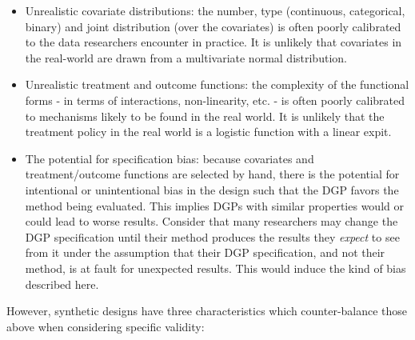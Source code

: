 \documentclass[../main.tex]{subfiles}
\begin{document}
\vspace{\baselineskip}
\begin{itemize}
    \item Unrealistic covariate distributions: the number, type (continuous, categorical, binary) and joint distribution (over the covariates) is often poorly calibrated to the data researchers encounter in practice. It is unlikely that covariates in the real-world are drawn from a multivariate normal distribution.\par


\vspace{\baselineskip}
    \item Unrealistic treatment and outcome functions: the complexity of the functional forms - in terms of interactions, non-linearity, etc. - is often poorly calibrated to mechanisms likely to be found in the real world. It is unlikely that the treatment policy in the real world is a logistic function with a linear expit.\par


\vspace{\baselineskip}
    \item The potential for specification bias: because covariates and treatment/outcome functions are selected by hand, there is the potential for intentional or unintentional bias in the design such that the DGP favors the method being evaluated. This implies DGPs with similar properties would or could lead to worse results. Consider that many researchers may change the DGP specification until their method produces the results they \textit{expect} to see from it under the assumption that their DGP specification, and not their method, is at fault for unexpected results. This would induce the kind of bias described here.
\end{itemize}\par


\vspace{\baselineskip}
However, synthetic designs have three characteristics which counter-balance those above when considering specific validity:\par
\end{document}
